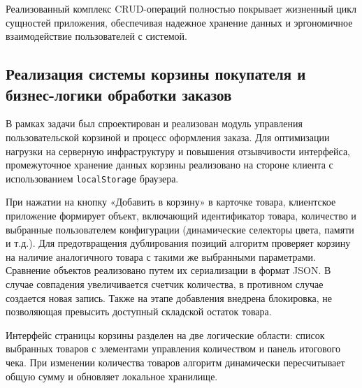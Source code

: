 Реализованный комплекс CRUD-операций полностью покрывает жизненный цикл сущностей приложения, обеспечивая надежное хранение данных и 
эргономичное взаимодействие пользователей с системой.

\subsection{Реализация системы корзины покупателя и бизнес-логики обработки заказов}

В рамках задачи был спроектирован и реализован модуль управления пользовательской корзиной и процесс оформления заказа. Для оптимизации нагрузки на 
серверную инфраструктуру и повышения отзывчивости интерфейса, промежуточное хранение данных корзины реализовано на стороне клиента с 
использованием \texttt{localStorage} браузера.

При нажатии на кнопку «Добавить в корзину» в карточке товара, клиентское приложение формирует объект, включающий идентификатор товара, количество и выбранные 
пользователем конфигурации (динамические селекторы цвета, памяти и т.д.). Для предотвращения дублирования позиций алгоритм проверяет корзину на наличие 
аналогичного товара с такими же выбранными параметрами. Сравнение объектов реализовано путем их сериализации в формат JSON. В случае совпадения увеличивается 
счетчик количества, в противном случае создается новая запись. Также на этапе добавления внедрена блокировка, не позволяющая превысить доступный складской остаток товара.

Интерфейс страницы корзины разделен на две логические области: список выбранных товаров с элементами управления количеством и панель итогового чека. При изменении 
количества товаров алгоритм динамически пересчитывает общую сумму и обновляет локальное хранилище. 

